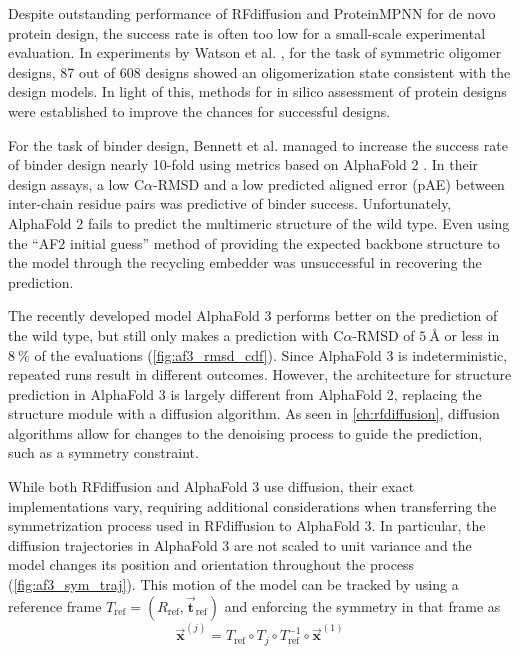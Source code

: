Despite outstanding performance of RFdiffusion and ProteinMPNN for de novo protein design, the success rate is often too low for a small-scale experimental evaluation. In experiments by Watson et al. \cite{RFdiffusion}, for the task of symmetric oligomer designs, 87 out of 608 designs showed an oligomerization state consistent with the design models. In light of this, methods for in silico assessment of protein designs were established to improve the chances for successful designs. 

For the task of binder design, Bennett et al. managed to increase the success rate of binder design nearly 10-fold using metrics based on AlphaFold 2 \cite{binder_design}. In their design assays, a low C$\alpha$-RMSD and a low predicted aligned error (pAE) between inter-chain residue pairs was predictive of binder success. Unfortunately, AlphaFold 2 fails to predict the multimeric structure of the wild type. Even using the ``AF2 initial guess'' method \cite{binder_design} of providing the expected backbone structure to the model through the recycling embedder was unsuccessful in recovering the prediction. 

The recently developed model AlphaFold 3 \cite{af3} performs better on the prediction of the wild type, but still only makes a prediction with C$\alpha$-RMSD of $\SI{5}{\angstrom}$ or less in $\SI{8}{\percent}$ of the evaluations (\autoref{fig:af3_rmsd_cdf}). Since AlphaFold 3 is indeterministic, repeated runs  result in different outcomes. However, the architecture for structure prediction in AlphaFold 3 is largely different from AlphaFold 2, replacing the structure module with a diffusion algorithm. As seen in \autoref{ch:rfdiffusion}, diffusion algorithms allow for changes to the denoising process to guide the prediction, such as a symmetry constraint. 

While both RFdiffusion and AlphaFold 3 use diffusion, their exact implementations vary, requiring additional considerations when transferring the symmetrization process used in RFdiffusion to AlphaFold 3. In particular, the diffusion trajectories in AlphaFold 3 are not scaled to unit variance and the model changes its position and orientation throughout the process (\autoref{fig:af3_sym_traj}). This motion of the model can be tracked by using a reference frame $T_{\text{ref}} = (R_{\text{ref}}, \vec{\mathbf{t}}_{\text{ref}})$ and enforcing the symmetry in that frame as 
\begin{equation}
\vec{\mathbf{x}}^{(j)} = T_{\text{ref}} \circ T_j \circ T_{\text{ref}}^{-1} \circ \vec{\mathbf{x}}^{(1)}
\end{equation}


